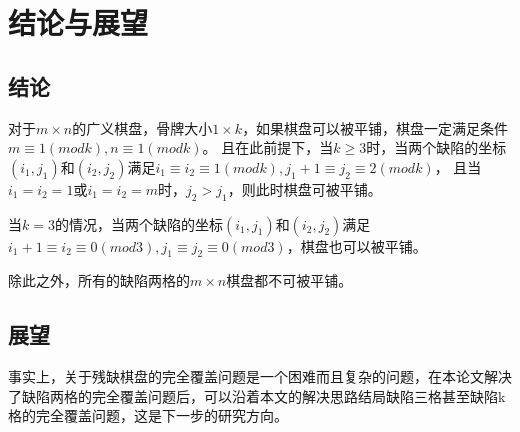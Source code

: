 \chapter{结论与展望}
\section{结论}
对于$m \times n$的广义棋盘，骨牌大小$1 \times k$，如果棋盘可以被平铺，棋盘一定满足条件$m \equiv 1 (mod k), n \equiv 1 (mod k)$。
且在此前提下，当$k \ge 3$时，当两个缺陷的坐标$(i_1, j_1)$和$(i_2, j_2)$满足$i_1 \equiv i_2 \equiv 1 (mod k), j_1 + 1 \equiv j_2 \equiv 2 (mod k)$，
且当$i_1 = i_2 = 1$或$i_1 = i_2 = m$时，$j_2 > j_1$，则此时棋盘可被平铺。

当$k = 3$的情况，当两个缺陷的坐标$(i_1, j_1)$和$(i_2, j_2)$满足$i_1 + 1\equiv i_2 \equiv 0 (mod 3), j_1 \equiv j_2 \equiv 0 (mod 3)$，棋盘也可以被平铺。

除此之外，所有的缺陷两格的$m \times n$棋盘都不可被平铺。

\section{展望}
事实上，关于残缺棋盘的完全覆盖问题是一个困难而且复杂的问题，在本论文解决了缺陷两格的完全覆盖问题后，可以沿着本文的解决思路结局缺陷三格甚至缺陷k格的完全覆盖问题，这是下一步的研究方向。
